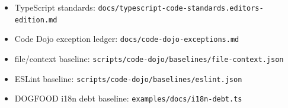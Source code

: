 \begin{itemize}
\tightlist
\item
  TypeScript standards: \texttt{d\allowbreak{}o\allowbreak{}c\allowbreak{}s\allowbreak{}/\allowbreak{}t\allowbreak{}y\allowbreak{}p\allowbreak{}e\allowbreak{}s\allowbreak{}c\allowbreak{}r\allowbreak{}i\allowbreak{}p\allowbreak{}t\allowbreak{}-\allowbreak{}c\allowbreak{}o\allowbreak{}d\allowbreak{}e\allowbreak{}-\allowbreak{}s\allowbreak{}t\allowbreak{}a\allowbreak{}n\allowbreak{}d\allowbreak{}a\allowbreak{}r\allowbreak{}d\allowbreak{}s\allowbreak{}.\allowbreak{}e\allowbreak{}d\allowbreak{}i\allowbreak{}t\allowbreak{}o\allowbreak{}r\allowbreak{}s\allowbreak{}-\allowbreak{}e\allowbreak{}d\allowbreak{}i\allowbreak{}t\allowbreak{}i\allowbreak{}o\allowbreak{}n\allowbreak{}.\allowbreak{}m\allowbreak{}d}
\item
  Code Dojo exception ledger: \texttt{d\allowbreak{}o\allowbreak{}c\allowbreak{}s\allowbreak{}/\allowbreak{}c\allowbreak{}o\allowbreak{}d\allowbreak{}e\allowbreak{}-\allowbreak{}d\allowbreak{}o\allowbreak{}j\allowbreak{}o\allowbreak{}-\allowbreak{}e\allowbreak{}x\allowbreak{}c\allowbreak{}e\allowbreak{}p\allowbreak{}t\allowbreak{}i\allowbreak{}o\allowbreak{}n\allowbreak{}s\allowbreak{}.\allowbreak{}m\allowbreak{}d}
\item
  file/context baseline: \texttt{s\allowbreak{}c\allowbreak{}r\allowbreak{}i\allowbreak{}p\allowbreak{}t\allowbreak{}s\allowbreak{}/\allowbreak{}c\allowbreak{}o\allowbreak{}d\allowbreak{}e\allowbreak{}-\allowbreak{}d\allowbreak{}o\allowbreak{}j\allowbreak{}o\allowbreak{}/\allowbreak{}b\allowbreak{}a\allowbreak{}s\allowbreak{}e\allowbreak{}l\allowbreak{}i\allowbreak{}n\allowbreak{}e\allowbreak{}s\allowbreak{}/\allowbreak{}f\allowbreak{}i\allowbreak{}l\allowbreak{}e\allowbreak{}-\allowbreak{}c\allowbreak{}o\allowbreak{}n\allowbreak{}t\allowbreak{}e\allowbreak{}x\allowbreak{}t\allowbreak{}.\allowbreak{}j\allowbreak{}s\allowbreak{}o\allowbreak{}n}
\item
  ESLint baseline: \texttt{s\allowbreak{}c\allowbreak{}r\allowbreak{}i\allowbreak{}p\allowbreak{}t\allowbreak{}s\allowbreak{}/\allowbreak{}c\allowbreak{}o\allowbreak{}d\allowbreak{}e\allowbreak{}-\allowbreak{}d\allowbreak{}o\allowbreak{}j\allowbreak{}o\allowbreak{}/\allowbreak{}b\allowbreak{}a\allowbreak{}s\allowbreak{}e\allowbreak{}l\allowbreak{}i\allowbreak{}n\allowbreak{}e\allowbreak{}s\allowbreak{}/\allowbreak{}e\allowbreak{}s\allowbreak{}l\allowbreak{}i\allowbreak{}n\allowbreak{}t\allowbreak{}.\allowbreak{}j\allowbreak{}s\allowbreak{}o\allowbreak{}n}
\item
  DOGFOOD i18n debt baseline: \texttt{e\allowbreak{}x\allowbreak{}a\allowbreak{}m\allowbreak{}p\allowbreak{}l\allowbreak{}e\allowbreak{}s\allowbreak{}/\allowbreak{}d\allowbreak{}o\allowbreak{}c\allowbreak{}s\allowbreak{}/\allowbreak{}i\allowbreak{}1\allowbreak{}8\allowbreak{}n\allowbreak{}-\allowbreak{}d\allowbreak{}e\allowbreak{}b\allowbreak{}t\allowbreak{}.\allowbreak{}t\allowbreak{}s}
\end{itemize}

